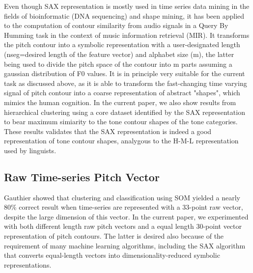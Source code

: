 \documentclass{article}
\begin{document}
Even though SAX representation is mostly used in time series data mining in the fields of bioinformatic (DNA sequencing) and shape mining, it has been applied to the computation of contour similarity from audio signals in a Query By Humming task \cite{Valero:13} in the context of music information retrieval (MIR). It transforms the pitch contour into a symbolic representation with a user-designated length (nseg=desired length of the feature vector) and alphabet size (m), the latter being used to divide the pitch space of the contour into m parts assuming a gaussian distribution of F0 values. It is in principle very suitable for the current task as discussed above, as it is able to transform the fast-changing time varying signal of pitch contour into a coarse representation of abstract "shapes", which mimics the human cognition. In the current paper, we also show results from hierarchical clustering using a core dataset identified by the SAX representation to bear maximum simiarity to the tone contour shapes of the tone categories. These results validates that the SAX representation is indeed a good representation of tone contour shapes, analygous to the H-M-L representation used by linguists.



\subsection{Raw Time-series Pitch Vector }
Gauthier \cite{gauthier:07} showed that clustering and classification using SOM yielded a nearly 80\% correct result when time-series are represented with a 33-point raw vector, despite the large dimension of this vector. In the current paper, we experimented with both different length raw pitch vectors and a equal length 30-point vector representation of pitch contours. The latter is desired also because of the requirement of many machine learning algorithms, including the SAX algorithm that converts equal-length vectors into dimensionality-reduced symbolic representations.










\end{document}
